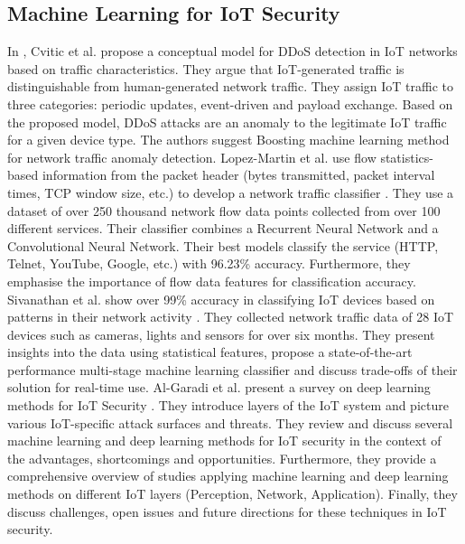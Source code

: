 \documentclass[conference, 11pt]{IEEEtran}
\begin{document}
    \subsection{Machine Learning for IoT Security}
    In \cite{cvitic2021novel}, Cvitic et al. propose a conceptual model for DDoS detection in IoT networks based on traffic characteristics.
    They argue that IoT-generated traffic is distinguishable from human-generated network traffic.
    They assign IoT traffic to three categories: periodic updates, event-driven and payload exchange.
    Based on the proposed model, DDoS attacks are an anomaly to the legitimate IoT traffic for a given device type.
    The authors suggest Boosting machine learning method for network traffic anomaly detection.
    Lopez-Martin et al. use flow statistics-based information from the packet header (bytes transmitted, packet interval times, TCP window size, etc.) to develop a network traffic classifier \cite{lopez2017network}.
    They use a dataset of over 250 thousand network flow data points collected from over 100 different services.
    Their classifier combines a Recurrent Neural Network and a Convolutional Neural Network.
    Their best models classify the service (HTTP, Telnet, YouTube, Google, etc.) with 96.23\% accuracy.
    Furthermore, they emphasise the importance of flow data features for classification accuracy.
    Sivanathan et al. show over 99\% accuracy in classifying IoT devices based on patterns in their network activity \cite{sivanathan2018classifying}.
    They collected network traffic data of 28 IoT devices such as cameras, lights and sensors for over six months.
    They present insights into the data using statistical features, propose a state-of-the-art performance multi-stage machine learning classifier and discuss trade-offs of their solution for real-time use.
    Al-Garadi et al. present a survey on deep learning methods for IoT Security \cite{article:5}.
    They introduce layers of the IoT system and picture various IoT-specific attack surfaces and threats.
    They review and discuss several machine learning and deep learning methods for IoT security in the context of the advantages, shortcomings and opportunities.
    Furthermore, they provide a comprehensive overview of studies applying machine learning and deep learning methods on different IoT layers (Perception, Network, Application).
    Finally, they discuss challenges, open issues and future directions for these techniques in IoT security.
\end{document}
